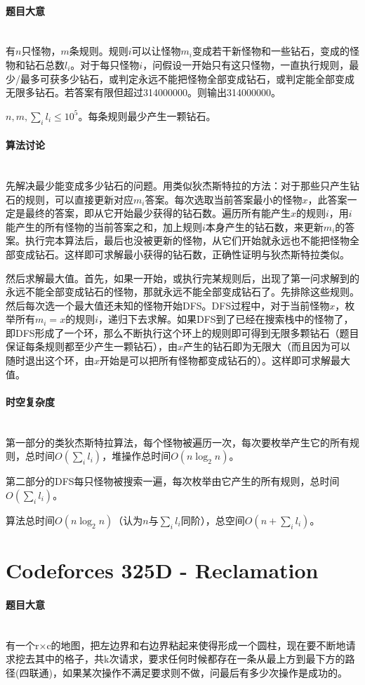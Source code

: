 \documentclass[UTF8]{ctexart}
\newcommand{\myparagraph}[1]{\paragraph{#1}\mbox{}\\}
\theoremstyle{nonumberplain}
\begin{document}
		\myparagraph{题目大意}
		
			有$n$只怪物，$m$条规则。规则$i$可以让怪物$m_i$变成若干新怪物和一些钻石，变成的怪物和钻石总数$l_i$。对于每只怪物$i$，问假设一开始只有这只怪物，一直执行规则，最少/最多可获多少钻石，或判定永远不能把怪物全部变成钻石，或判定能全部变成无限多钻石。若答案有限但超过314000000。则输出314000000。
			
			$n,m,\sum_il_i \leq 10^5$。每条规则最少产生一颗钻石。
		
		\myparagraph{算法讨论}
		
			先解决最少能变成多少钻石的问题。用类似狄杰斯特拉的方法：对于那些只产生钻石的规则，可以直接更新对应$m_i$答案。每次选取当前答案最小的怪物$x$，此答案一定是最终的答案，即从它开始最少获得的钻石数。遍历所有能产生$x$的规则$i$，用$i$能产生的所有怪物的当前答案之和，加上规则$i$本身产生的钻石数，来更新$m_i$的答案。执行完本算法后，最后也没被更新的怪物，从它们开始就永远也不能把怪物全部变成钻石。这样即可求解最小获得的钻石数，正确性证明与狄杰斯特拉类似。
			
			然后求解最大值。首先，如果一开始，或执行完某规则后，出现了第一问求解到的永远不能全部变成钻石的怪物，那就永远不能全部变成钻石了。先排除这些规则。然后每次选一个最大值还未知的怪物开始DFS。DFS过程中，对于当前怪物$x$，枚举所有$m_i=x$的规则$i$，递归下去求解。如果DFS到了已经在搜索栈中的怪物了，即DFS形成了一个环，那么不断执行这个环上的规则即可得到无限多颗钻石（题目保证每条规则都至少产生一颗钻石），由$x$产生的钻石即为无限大（而且因为可以随时退出这个环，由$x$开始是可以把所有怪物都变成钻石的）。这样即可求解最大值。
		
		\myparagraph{时空复杂度}
		
			第一部分的类狄杰斯特拉算法，每个怪物被遍历一次，每次要枚举产生它的所有规则，总时间$O(\sum_il_i)$，堆操作总时间$O(n\log_2n)$。
			
			第二部分的DFS每只怪物被搜索一遍，每次枚举由它产生的所有规则，总时间$O(\sum_il_i)$。
			
			算法总时间$O(n\log_2n)$（认为$n$与$\sum_il_i$同阶），总空间$O(n+\sum_il_i)$。
	
	\section{Codeforces 325D - Reclamation}
		
		\myparagraph{题目大意}
		
			有一个r×c的地图，把左边界和右边界粘起来使得形成一个圆柱，现在要不断地请求挖去其中的格子，共k次请求，要求任何时候都存在一条从最上方到最下方的路径(四联通)，如果某次操作不满足要求则不做，问最后有多少次操作是成功的。
		
\end{document}
